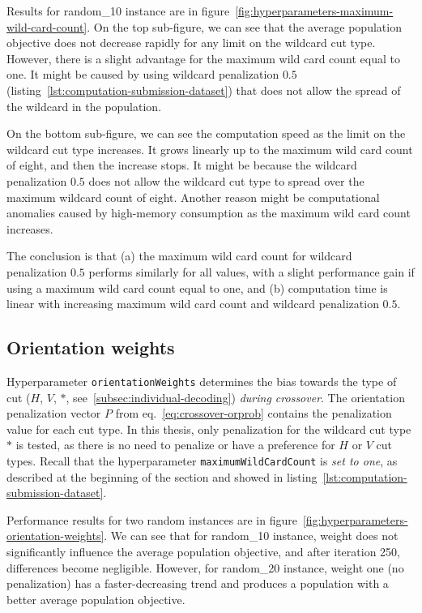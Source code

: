 Results for random\_10 instance are in figure~\ref{fig:hyperparameters-maximum-wild-card-count}.
On the top sub-figure, we can see that the average population objective does not decrease rapidly for any limit on the wildcard cut type.
However, there is a slight advantage for the maximum wild card count equal to one.
It might be caused by using wildcard penalization $0.5$ (listing~\ref{lst:computation-submission-dataset})
that does not allow the spread of the wildcard in the population.

On the bottom sub-figure, we can see the computation speed as the limit on the wildcard cut type increases.
It grows linearly up to the maximum wild card count of eight, and then the increase stops.
It might be because the wildcard penalization $0.5$ does not
allow the wildcard cut type to spread over the maximum wildcard count of eight.
Another reason might be computational anomalies caused by high-memory consumption as the maximum wild card count increases.

The conclusion is that (a) the maximum wild card count for wildcard penalization $0.5$
performs similarly for all values, with a slight performance gain if using a maximum wild card count equal to one,
and (b) computation time is linear with increasing maximum wild card count and wildcard penalization $0.5$.

\subsection{Orientation weights}\label{subsec:orientation-weights}
Hyperparameter \verb|orientationWeights| determines the bias towards the type of cut ($H$, $V$, $*$, see~\ref{subsec:individual-decoding}) \textit{during crossover}.
The orientation penalization vector $P$ from eq.~\ref{eq:crossover-orprob} contains the penalization value for each cut type.
In this thesis, only penalization for the wildcard cut type $*$ is tested, as there is no need to penalize or have a preference for $H$ or $V$ cut types.
Recall that the hyperparameter \verb|maximumWildCardCount| is \textit{set to one}, as described at the beginning of the section and showed in listing~\ref{lst:computation-submission-dataset}.

Performance results for two random instances are in figure~\ref{fig:hyperparameters-orientation-weights}.
We can see that for random\_10 instance,
weight does not significantly influence the average population objective, and after iteration 250, differences become negligible.
However, for random\_20 instance,
weight one (no penalization) has a faster-decreasing trend and produces a population with a better average population objective.

